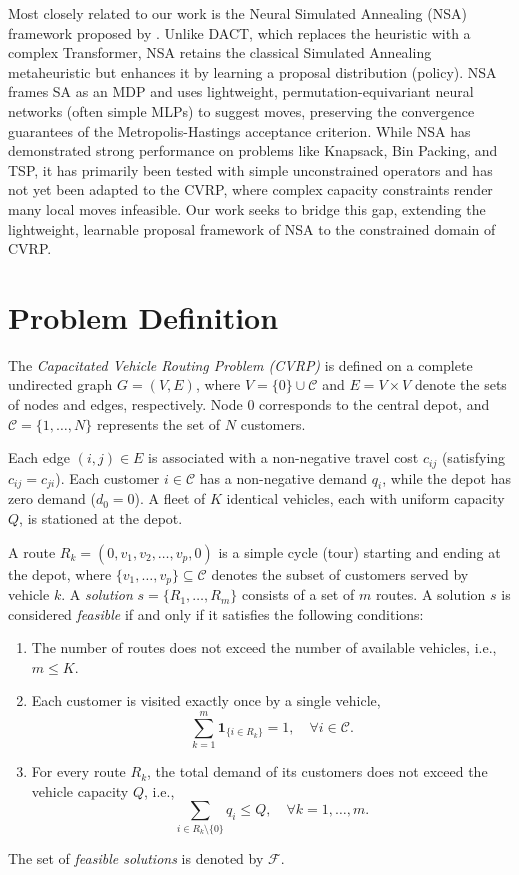 \documentclass[letterpaper]{article} %
\begin{document}
Most closely related to our work is the Neural Simulated Annealing (NSA) framework proposed by \citet{correia_neural_2023}. Unlike DACT, which replaces the heuristic with a complex Transformer, NSA retains the classical Simulated Annealing metaheuristic but enhances it by learning a proposal distribution (policy). NSA frames SA as an MDP and uses lightweight, permutation-equivariant neural networks (often simple MLPs) to suggest moves, preserving the convergence guarantees of the Metropolis-Hastings acceptance criterion. While NSA has demonstrated strong performance on problems like Knapsack, Bin Packing, and TSP, it has primarily been tested with simple unconstrained operators and has not yet been adapted to the CVRP, where complex capacity constraints render many local moves infeasible. Our work seeks to bridge this gap, extending the lightweight, learnable proposal framework of NSA to the constrained domain of CVRP.

\section{Problem Definition}
\label{Problem Definition}

The \textit{Capacitated Vehicle Routing Problem (CVRP)} is defined on a complete undirected graph $G = (V, E)$, where $V = \{0\} \cup \mathcal{C}$ and $E = V \times V$ denote the sets of nodes and edges, respectively. Node $0$ corresponds to the central depot, and $\mathcal{C} = \{1, \dots, N\}$ represents the set of $N$ customers. 

Each edge $(i, j) \in E$ is associated with a non-negative travel cost $c_{ij}$ (satisfying $c_{ij} = c_{ji}$). Each customer $i \in \mathcal{C}$ has a non-negative demand $q_i$, while the depot has zero demand ($d_0 = 0$). A fleet of $K$ identical vehicles, each with uniform capacity $Q$, is stationed at the depot.

A route $R_k = (0, v_1, v_2, \ldots, v_p, 0)$ is a simple cycle (tour) starting and ending at the depot, where $\{v_1, \ldots, v_p\} \subseteq \mathcal{C}$ denotes the subset of customers served by vehicle $k$. A \textit{solution} $s = \{R_1, \ldots, R_m\}$ consists of a set of $m$ routes. A solution $s$ is considered \textit{feasible} if and only if it satisfies the following conditions:
\begin{enumerate}
    \item The number of routes does not exceed the number of available vehicles, i.e., $m \leq K$.
    \item Each customer is visited exactly once by a single vehicle,
    $$
    \sum_{k=1}^{m} \mathbf{1}_{\{i \in R_k\}} = 1, \quad \forall i \in \mathcal{C} .
    $$
    \item For every route $R_k$, the total demand of its customers does not exceed the vehicle capacity $Q$, i.e.,
    $$
    \sum_{i \in R_k \setminus \{0\}} q_i \leq Q, \quad \forall k = 1, \ldots, m.
    $$
\end{enumerate}
The set of \textit{feasible solutions} is denoted by $\mathcal{F}$.
\end{document}

